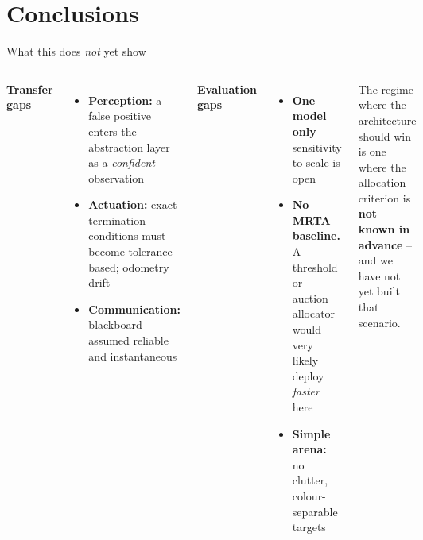 \documentclass[aspectratio=169,10pt]{beamer}
\newcommand{\callout}[2][upmblue]{%
  \begin{beamercolorbox}[wd=\linewidth,sep=6pt,rounded=false]{}%
    \color{#1}\small #2%
  \end{beamercolorbox}%
}
\begin{document}
\section{Conclusions}

\begin{frame}{What this does \emph{not} yet show}
  \begin{columns}[T]
  \textbf{\color{upmred}Transfer gaps}
  \begin{itemize}\small
    \item \textbf{Perception:} a false positive enters the abstraction
      layer as a \emph{confident} observation
    \item \textbf{Actuation:} exact termination conditions must become
      tolerance-based; odometry drift
    \item \textbf{Communication:} blackboard assumed reliable and
      instantaneous
  \end{itemize}
  \textbf{\color{upmred}Evaluation gaps}
  \begin{itemize}\small
    \item \textbf{One model only} -- sensitivity to scale is open
    \item \textbf{No MRTA baseline.} A threshold or auction allocator would
      very likely deploy \emph{faster} here
    \item \textbf{Simple arena:} no clutter, colour-separable targets
  \end{itemize}
  \vspace{4pt}
  \callout[upmnavy]{\footnotesize The regime where the architecture should
  win is one where the allocation criterion is \textbf{not known in
  advance} -- and we have not yet built that scenario.}
  \end{columns}
\end{frame}
\end{document}
